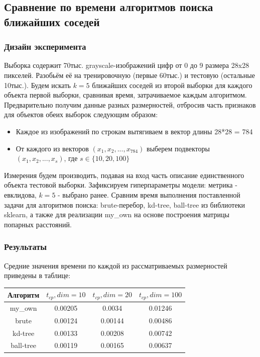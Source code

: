\documentclass{article}
\begin{document}
    \subsection{Сравнение по времени алгоритмов поиска ближайших соседей}
        \subsubsection{Дизайн эксперимента}
            Выборка содержит 70тыс. grayscale-изображений цифр от 0 до 9 размера 28x28 пикселей.
            Разобьём её на тренировочную (первые 60тыс.) и тестовую (остальные 10тыс.).
            Будем искать $k=5$ ближайших соседей из второй выборки для каждого объекта первой выборки, сравнивая время, затрачиваемое каждым алгоритмом.
            Предварительно получим данные разных размерностей, отбросив часть признаков для объектов обеих выборок следующим образом:
            \begin{itemize}
                \item Каждое из изображений по строкам вытягиваем в вектор длины 28*28 = 784
                \item От каждого из векторов $(x_1, x_2, ..., x_{784})$ выберем подвекторы $(x_1, x_2, ..., x_s)$, где $s \in \{10, 20, 100\}$
            \end{itemize}

            Измерения будем производить, подавая на вход часть описание единственного объекта тестовой выборки.
            Зафиксируем гиперпараметры модели: метрика - евклидова, $k=5$ - выбрано ранее.
            Сравним время выполнения поставленной задачи для алгоритмов поиска: brute-перебор, kd-tree, ball-tree из библиотеки sklearn, а также для реализации my\_own на основе построения матрицы попарных расстояний.
        \subsubsection{Результаты}
            Средние значения времени по каждой из рассматриваемых размерностей приведены в таблице:
            \begin{center}
                \begin{tabular}{ c | c | c | c  }
                    Алгоритм & $t_{cp}, dim=10$ & $t_{cp}, dim=20$ & $t_{cp}, dim=100$ \\
                    \hline
                    my\_own & 0.00205 & 0.0034 & 0.01246 \\
                    \hline
                    brute & 0.00124 & 0.00144 & 0.00486 \\
                    \hline
                    kd-tree & 0.00133 & 0.00208 & 0.00742 \\
                    \hline
                    ball-tree & 0.00119 & 0.00165 & 0.00637 \\
                \end{tabular}
                \end{center}
\end{document}
